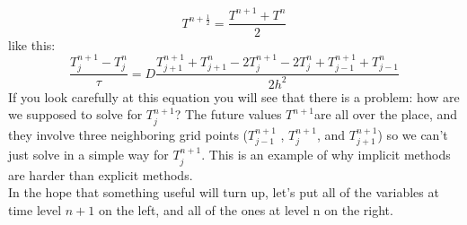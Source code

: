 \begin{equation}\label{eq:718}
T^{n+\frac{1}{2}}=\frac{T^{n+1}+T^{n}}{2}
\end{equation}
like this:
\begin{equation}\label{eq:719}
\frac{T_{j}^{n+1}-T_{j}^{n}}{\tau}=D \frac{T_{j+1}^{n+1}+T_{j+1}^{n}-2 T_{j}^{n+1}-2 T_{j}^{n}+T_{j-1}^{n+1}+T_{j-1}^{n}}{2 h^{2}}
\end{equation}
If you look carefully at this equation you will see that there is a problem: how are
we supposed to solve for $T^{n+1}_j$? The future values $T^{n+1}$are all over the place, and
they involve three neighboring grid points ($T^{n+1}_{j-1}$ , $T^{n+1}_{j}$, and $T^{n+1}_{j+1}$) so we can’t just
solve in a simple way for $T^{n+1}_j$. This is an example of why implicit methods are
harder than explicit methods. \\ 
In the hope that something useful will turn up, let\rq s put all of the variables at
time level $n +1$ on the left, and all of the ones at level n on the right.

